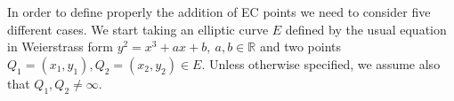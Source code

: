 \begin{center}
	\noindent
	\label{fig:figure2}
\end{center}
\noindent
In order to define properly the addition of EC points we need to consider five different cases. We start taking an elliptic curve $E$ defined by the usual equation in Weierstrass form $y^2 = x^3 + ax + b, \ a,b \in \mathbb{R}$ and two points $Q_1 = (x_1, y_1), Q_2 = (x_2, y_2) \in E$. Unless otherwise specified, we assume also that $Q_1, Q_2 \neq \infty$.
